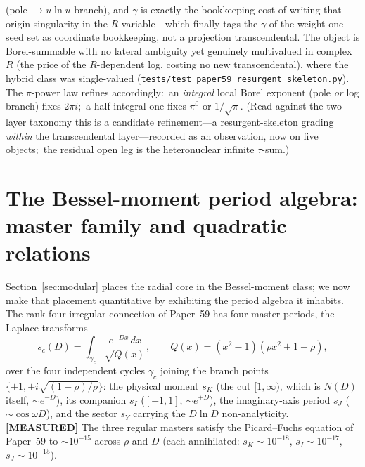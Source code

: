 \documentclass[aps,pra,twocolumn,superscriptaddress,longbibliography]{revtex4-2}
\begin{document}
(pole $\to u\ln u$ branch), and $\gamma$ is exactly the bookkeeping cost of writing that origin
singularity in the $R$ variable---which finally tags the $\gamma$ of the weight-one seed set as
coordinate bookkeeping, not a projection transcendental.  The object is Borel-summable with no
lateral ambiguity yet genuinely multivalued in complex $R$ (the price of the $R$-dependent log,
costing no new transcendental), where the hybrid class was single-valued
(\texttt{tests/test\_paper59\_resurgent\_skeleton.py}).  The $\pi$-power law refines
accordingly:\ an \emph{integral} local Borel exponent (pole \emph{or} log branch) fixes $2\pi
i$;\ a half-integral one fixes $\pi^{0}$ or $1/\sqrt\pi$.  (Read against the two-layer taxonomy
this is a candidate refinement---a resurgent-skeleton grading \emph{within} the transcendental
layer---recorded as an observation, now on five objects;\ the residual open leg is the
heteronuclear infinite $\tau$-sum.)

\section{The Bessel-moment period algebra: master family and quadratic
relations}
\label{sec:bessel_algebra}

Section~\ref{sec:modular} places the radial core in the Bessel-moment
class; we now make that placement quantitative by exhibiting the period algebra
it inhabits.  The rank-four irregular connection of Paper~59 has four master
periods, the Laplace transforms
%
\begin{equation}
s_{c}(D)=\int_{\gamma_{c}}\frac{e^{-Dx}\,dx}{\sqrt{Q(x)}},
\qquad Q(x)=(x^{2}-1)(\rho x^{2}+1-\rho),
\end{equation}
%
over the four independent cycles $\gamma_{c}$ joining the branch points
$\{\pm1,\pm i\sqrt{(1-\rho)/\rho}\}$: the physical moment $s_{K}$ (the cut
$[1,\infty)$, which is $N(D)$ itself, $\sim e^{-D}$), its companion $s_{I}$
($[-1,1]$, $\sim e^{+D}$), the imaginary-axis period $s_{J}$
($\sim\cos\omega D$), and the sector $s_{Y}$ carrying the $D\ln D$
non-analyticity.  \textbf{[MEASURED]} The three regular masters satisfy
the Picard--Fuchs equation of Paper~59 to $\sim\!10^{-15}$ across $\rho$ and $D$ (each
annihilated: $s_{K}\!\sim\!10^{-18}$, $s_{I}\!\sim\!10^{-17}$,
$s_{J}\!\sim\!10^{-15}$).
\end{document}
